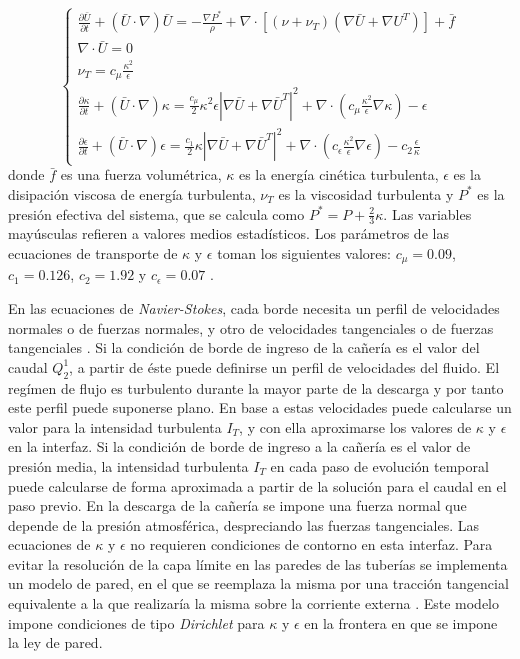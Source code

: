 \begin{equation}
\left\{ \begin{array}{l}
\displaystyle \frac{\partial \bar{U} }{\partial t} + ( \bar{U} \cdot \nabla) \bar{U} = - \frac {\nabla P^*}{\rho} + 
\nabla \cdot \left[ \left( \nu + \nu_T \right) \left( \nabla \bar{U} + \nabla U^T \right) \right] +\bar{f} \\
\nabla \cdot \bar{U} =0 \\
\displaystyle \nu_T = c_\mu \frac{\kappa^2}{\epsilon} \\
\displaystyle \frac{\partial \kappa}{\partial t} + ( \bar{U} \cdot \nabla) \kappa = \frac{c_\mu} {2}{\kappa^2}{\epsilon} \left | \nabla \bar{U} + \nabla\bar{U}^T \right | ^2  
+ \nabla \cdot \left( c_\mu \frac{\kappa^2}{\epsilon} \nabla \kappa \right) - \epsilon \\
\displaystyle \frac{\partial {\epsilon}}{\partial t} + ( \bar{U} \cdot \nabla) \epsilon = \frac{c_1} {2} \kappa \left | \nabla \bar{U} + \nabla \bar{U}^T \right | ^2
+ \nabla \cdot \left( c_{\epsilon} \frac{\kappa^2}{\epsilon} \nabla \epsilon \right) - c_2 \frac{\epsilon}{\kappa}
\label{eq-mani}
\end{array} \right.
\end{equation}
donde $\bar{f}$ es una fuerza volumétrica, 
$\kappa$ es la energía cinética turbulenta, $\epsilon$ es la disipación viscosa de energía turbulenta,
$\nu_T$ es la viscosidad turbulenta y $P^*$ es la presión efectiva del sistema, que se calcula como
$\displaystyle P^* = P + \frac {2}{3}\kappa$.
Las variables mayúsculas refieren a valores medios estadísticos.
Los parámetros de las ecuaciones de transporte de $\kappa$ y $\epsilon$ toman los siguientes valores:
$c_\mu=0.09$, $c_1=0.126$, $c_2=1.92$ y $c_\epsilon=0.07$ \cite{durbin}.

En las ecuaciones de \textit{Navier-Stokes}, cada borde necesita un perfil de velocidades normales o de fuerzas normales,
y otro de velocidades tangenciales o de fuerzas tangenciales \cite{gunzburger}.
Si la condición de borde de ingreso de la cañería es el valor del caudal $Q_2^1$,
a partir de éste puede definirse un perfil de velocidades del fluido.
El regímen de flujo es turbulento durante la mayor parte de la descarga y por tanto este perfil puede suponerse plano.
En base a estas velocidades puede calcularse un valor para la intensidad turbulenta $I_T$,
y con ella aproximarse los valores de $\kappa$ y $\epsilon$ en la interfaz.
Si la condición de borde de ingreso a la cañería es el valor de presión media,
la intensidad turbulenta $I_T$ en cada paso de evolución temporal puede calcularse de forma aproximada a partir de la solución para el caudal en el paso previo.
En la descarga de la cañería se impone una fuerza normal que depende de la presión atmosférica,
despreciando las fuerzas tangenciales.
Las ecuaciones de $\kappa$ y $\epsilon$ no requieren condiciones de contorno en esta interfaz.
Para evitar la resolución de la capa límite en las paredes de las tuberías se implementa un modelo de pared,
en el que se reemplaza la misma por una tracción tangencial equivalente a la que realizaría la misma sobre la corriente externa
\cite{k-e}.
Este modelo impone condiciones de tipo \textit{Dirichlet} para $\kappa$ y $\epsilon$ en la frontera en que se impone la ley de pared.


